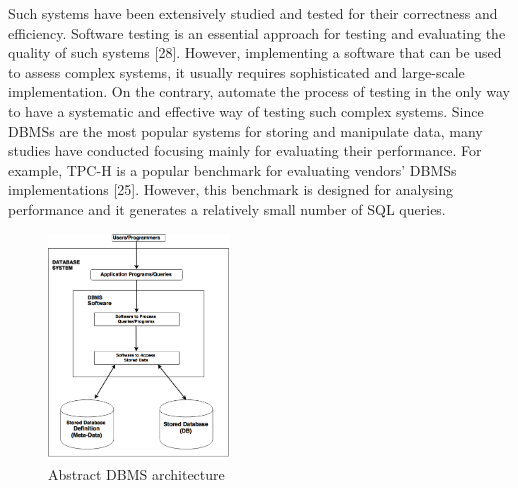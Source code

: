Such systems have been extensively studied and tested for their correctness and efficiency. Software testing is an essential approach for testing and evaluating the quality of such systems [28]. However, implementing a software that can be used to assess complex systems, it usually requires sophisticated and large-scale implementation. On the contrary, automate the process of testing in the only way to have a systematic and effective way of testing such complex systems. Since DBMSs are the most popular systems for storing and manipulate data, many studies have conducted focusing mainly for evaluating their performance. For example, TPC-H is a popular benchmark for evaluating vendors’ DBMSs implementations [25]. However, this benchmark is designed for analysing performance and it generates a relatively small number of SQL queries. 

 \begin{figure} 
      \centering
      \includegraphics[width=\textwidth,height=6cm]{Images/db_arch}
      \caption{Abstract DBMS architecture}
      \label{fig:counting-methods}
  \end{figure}

  
